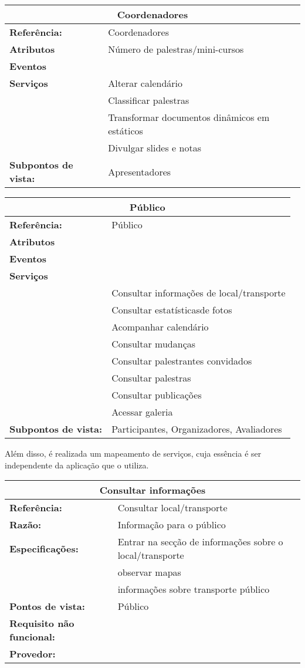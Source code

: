 \documentclass[letter]{article}
\begin{document}
\begin{center}
%
\begin{table}[h!]
\begin{center}
\begin{tabular}{|ll|}
\hline 
\multicolumn{2}{|c|}{\textbf{Coordenadores}}\tabularnewline
\hline
\textbf{Referência:} & Coordenadores\tabularnewline
\textbf{Atributos} & Número de palestras/mini-cursos\tabularnewline
\textbf{Eventos} & \tabularnewline
\textbf{Serviços} & Alterar calendário\tabularnewline
 & Classificar palestras\tabularnewline
 & Transformar documentos dinâmicos em estáticos\tabularnewline
 & Divulgar slides e notas\tabularnewline
\textbf{Subpontos de vista:} & Apresentadores \tabularnewline
\hline
\end{tabular}
\end{center}
\end{table}


%
\begin{table}[h!]
\begin{center}
\begin{tabular}{|ll|}
\hline 
\multicolumn{2}{|c|}{\textbf{Público}}\tabularnewline
\hline
\textbf{Referência:} &  Público\tabularnewline
\textbf{Atributos} & \tabularnewline
\textbf{Eventos} & \tabularnewline
\textbf{Serviços} & \tabularnewline
 & Consultar informações de local/transporte\tabularnewline
 & Consultar estatísticasde fotos\tabularnewline
 & Acompanhar calendário \tabularnewline
 & Consultar mudanças\tabularnewline
 & Consultar palestrantes convidados\tabularnewline
 & Consultar palestras\tabularnewline
 & Consultar publicações\tabularnewline
 & Acessar galeria\tabularnewline
\textbf{Subpontos de vista:} & Participantes, Organizadores, Avaliadores \tabularnewline
\hline

\end{tabular}

\end{center}

\end{table}

\end{center}


\newpage
Além disso, é realizada um mapeamento de serviços, cuja essência é ser independente da aplicação que o utiliza.

\begin{table}[h!]\begin{center}
\begin{tabular}{|ll|}
\hline 
\multicolumn{2}{|c|}{\textbf{Consultar informações}}\tabularnewline
\hline
\textbf{Referência:} & Consultar local/transporte\tabularnewline
\textbf{Razão:} & Informação para o público\tabularnewline
\textbf{Especificações:} & Entrar na secção de informações sobre o local/transporte\tabularnewline
 & observar mapas\tabularnewline
 & informações sobre transporte público\tabularnewline
\textbf{Pontos de vista:} & Público\tabularnewline
\textbf{Requisito não funcional:} & \tabularnewline
\textbf{Provedor:} & \tabularnewline
\hline\end{tabular}\end{center}
\end{table}
\end{document}
